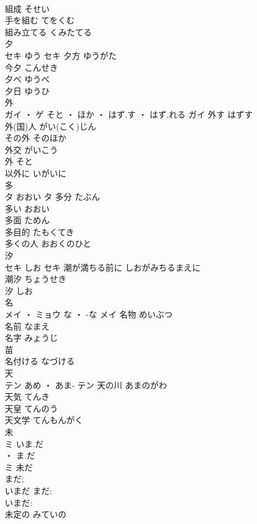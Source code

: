 \documentclass[8pt]{extreport}
\begin{document}
\begin{CJK}{UTF8}{min}
\\	組成	そせい	
\\	手を組む	てをくむ	
\\	組み立てる	くみたてる	
\\	夕	
\\	セキ	ゆう	セキ	夕方	ゆうがた	
\\	今夕	こんせき	
\\	夕べ	ゆうべ	
\\	夕日	ゆうひ	
\\	外	
\\	ガイ ・ ゲ	そと ・ ほか ・ はず.す ・ はず.れる	ガイ	外す	はずす	
\\	外(国)人	がい(こく)じん	
\\	その外	そのほか	
\\	外交	がいこう	
\\	外	そと	
\\	以外に	いがいに	
\\	多	
\\	タ	おおい	タ	多分	たぶん	
\\	多い	おおい	
\\	多面	ためん	
\\	多目的	たもくてき	
\\	多くの人	おおくのひと	
\\	汐	
\\	セキ	しお	セキ	潮が満ちる前に	しおがみちるまえに	
\\	潮汐	ちょうせき	
\\	汐	しお	
\\	名	
\\	メイ ・ ミョウ	な ・ -な	メイ	名物	めいぶつ	
\\	名前	なまえ	
\\	名字	みょうじ	
\\	苗 
\\	名付ける	なづける	
\\	天	
\\	テン	あめ ・ あま-	テン	天の川	あまのがわ	
\\	天気	てんき	
\\	天皇	てんのう	
\\	天文学	てんもんがく	
\\	未	
\\	ミ	いま.だ
\\	・ ま.だ
\\	ミ	未だ 
\\	まだ; 
\\	いまだ	まだ: 
\\	いまだ: 
\\	未定の	みていの	

\end{CJK}
\end{document}
